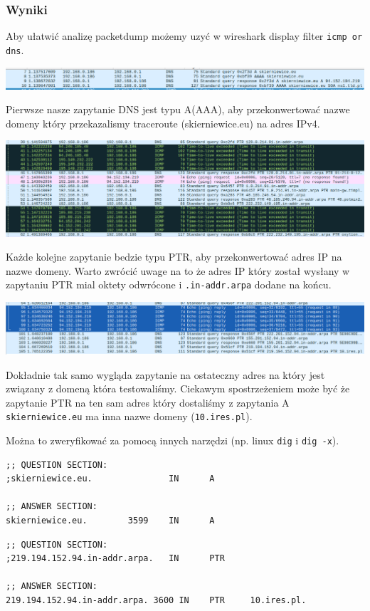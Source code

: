 \documentclass[11pt]{article}
\begin{document}
\subsubsection{Wyniki}
\label{sec:org4634d97}
Aby ułatwić analizę packetdump możemy uzyć w wireshark display filter \texttt{icmp or dns}.
\begin{center}
\includegraphics[width=.9\linewidth]{./part2/dnsA.png}
\end{center}
Pierwsze nasze zapytanie DNS jest typu A(AAA), aby przekonwertować nazwe domeny który przekazalismy traceroute (skierniewice.eu) na adres IPv4.
\begin{center}
\includegraphics[width=.9\linewidth]{./part2/dnsPTR1.png}
\end{center}
Każde kolejne zapytanie bedzie typu PTR, aby przekonwertować adres IP na nazwe domeny. Warto zwrócić uwage na to że adres IP który został wysłany w zapytaniu PTR mial oktety odwrócone i \texttt{.in-addr.arpa} dodane na końcu.
\begin{center}
\includegraphics[width=.9\linewidth]{./part2/dnsPTR2.png}
\end{center}
Dokładnie tak samo wygląda zapytanie na ostateczny adres na który jest związany z domeną która testowaliśmy.
Ciekawym spostrzeżeniem może być że zapytanie PTR na ten sam adres który dostaliśmy z zapytania A \texttt{skierniewice.eu} ma inna nazwe domeny (\texttt{10.ires.pl}).

Można to zweryfikować za pomocą innych narzędzi (np. linux \texttt{dig} i \texttt{dig -x}).
\begin{verbatim}
;; QUESTION SECTION:
;skierniewice.eu.               IN      A

;; ANSWER SECTION:
skierniewice.eu.        3599    IN      A      
\end{verbatim}
\begin{verbatim}
;; QUESTION SECTION:
;219.194.152.94.in-addr.arpa.   IN      PTR

;; ANSWER SECTION:
219.194.152.94.in-addr.arpa. 3600 IN    PTR     10.ires.pl.
\end{verbatim}
\end{document}
